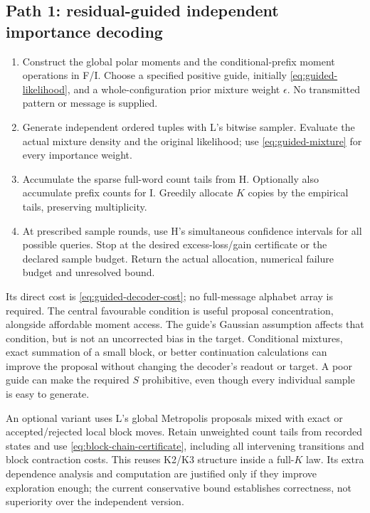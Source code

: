 \documentclass[10pt,a4paper]{article}
\begin{document}
\subsection{Path 1: residual-guided independent importance decoding}
\begin{enumerate}
\item Construct the global polar moments and the conditional-prefix moment operations in F/I. Choose a
      specified positive guide, initially \eqref{eq:guided-likelihood}, and a whole-configuration prior
      mixture weight $\epsilon$. No transmitted pattern or message is supplied.
\item Generate independent ordered tuples with L's bitwise sampler. Evaluate the actual mixture density
      and the original likelihood; use \eqref{eq:guided-mixture} for every importance weight.
\item Accumulate the sparse full-word count tails from H. Optionally also accumulate prefix counts for I.
      Greedily allocate $K$ copies by the empirical tails, preserving multiplicity.
\item At prescribed sample rounds, use H's simultaneous confidence intervals for all possible queries.
      Stop at the desired excess-loss/gain certificate or the declared sample budget. Return the actual
      allocation, numerical failure budget and unresolved bound.
\end{enumerate}
Its direct cost is \eqref{eq:guided-decoder-cost}; no full-message alphabet array is required.
The central favourable condition is useful proposal concentration, alongside affordable moment access.
The guide's Gaussian assumption affects that condition, but is not an uncorrected bias in the target.
Conditional mixtures, exact summation of a small block, or better continuation calculations can improve
the proposal without changing the decoder's readout or target. A poor guide can make the required $S$
prohibitive, even though every individual sample is easy to generate.

An optional variant uses L's global Metropolis proposals mixed with exact or accepted/rejected local
block moves. Retain unweighted count tails from recorded states and use
\eqref{eq:block-chain-certificate}, including all intervening transitions and block contraction costs.
This reuses K2/K3 structure inside a full-$K$ law. Its extra dependence analysis and computation are
justified only if they improve exploration enough; the current conservative bound establishes correctness,
not superiority over the independent version.
\end{document}
